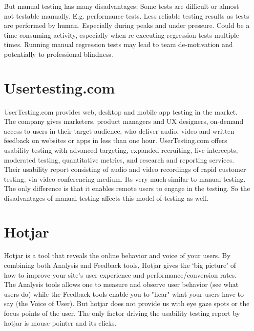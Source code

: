 \documentclass[12pt,a4paper,final]{extreport}
\begin{document}
But manual testing has many disadvantages; 
Some tests are difficult or almost not testable manually. E.g. performance tests.
Less reliable testing results as tests are performed by human. Especially during peaks and under pressure.
Could be a time-consuming activity, especially when re-executing regression tests multiple times.
Running manual regression tests may lead to team de-motivation and potentially to professional blindness.

\section{Usertesting.com}
\paragraph{}
UserTesting.com provides web, desktop and mobile app testing in the market. The company gives marketers, product managers and UX designers, on-demand access to users in their target audience, who deliver audio, video and written feedback on websites or apps in less than one hour. UserTesting.com offers usability testing with advanced targeting, expanded recruiting, live intercepts, moderated testing, quantitative metrics, and research and reporting services.
Their usability report consisting of audio and video recordings of rapid customer testing, via video conferencing medium. Its very much similar to manual testing. The only difference is that it enables remote users to engage in the testing. So the disadvantages of manual testing affects this model of testing as well.

\section{Hotjar}
\paragraph{}
Hotjar is a tool that reveals the online behavior and voice of your users. By combining both Analysis and Feedback tools, Hotjar gives the ‘big picture’ of how to improve your site's user experience and performance/conversion rates.
The Analysis tools allows one to measure and observe user behavior (see what users do) while the Feedback tools enable you to "hear" what your users have to say (the Voice of User).
But hotjar does not provide us with eye gaze spots or the focus points of the user. The only factor driving the usability testing report by hotjar is mouse pointer and its clicks.
\end{document}
